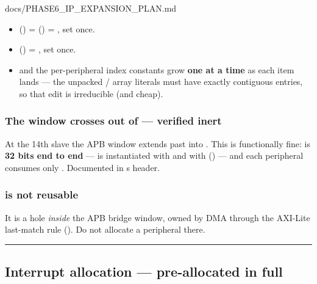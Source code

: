 \begin{relocated}{docs/PHASE6_IP_EXPANSION_PLAN.md}
{}

\begin{itemize}
\tightlist
\item
   () =
   () =
  \textbf{}, set once.
\item
   () =
  \textbf{}, set once.
\item
   and the per-peripheral index constants grow
  \textbf{one at a time} as each item lands --- the unpacked
  / array literals must have
  exactly  contiguous entries, so that edit is
  irreducible (and cheap).
\end{itemize}

\subsubsection{\texorpdfstring{The window crosses out of
 --- verified
inert}{The window crosses out of  --- verified inert}}\label{ds:ch:phase6-ip-expansion-plan:the-window-crosses-out-of-0x2000-xxxx-verified-inert}

At the 14th slave the APB window extends past  into
. This is functionally fine:  is
\textbf{32 bits end to end} ---  is instantiated with
 and  with 
() --- and each peripheral consumes
only . Documented in
\textquotesingle s header.

\subsubsection{\texorpdfstring{ is not
reusable}{ is not reusable}}\label{ds:ch:phase6-ip-expansion-plan:0x2000-5000-is-not-reusable}

It is a hole \emph{inside} the APB bridge window, owned by DMA through
the AXI-Lite last-match rule
(). Do not allocate a
peripheral there.

\begin{center}\rule{0.5\linewidth}{0.5pt}\end{center}

\subsection{Interrupt allocation --- pre-allocated in full}\label{ds:ch:phase6-ip-expansion-plan:5-interrupt-allocation-pre-allocated-in-full}


\end{relocated}
